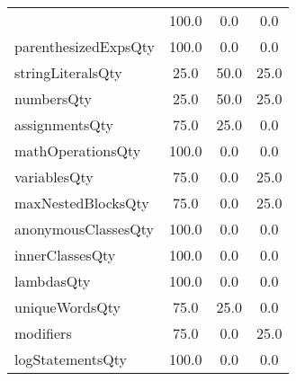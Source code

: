\begin{tabular}{lccc}
{tryCatchQty & 100.0 & 0.0 & 0.0 \\
parenthesizedExpsQty & 100.0 & 0.0 & 0.0 \\
stringLiteralsQty & 25.0 & 50.0 & 25.0 \\
numbersQty & 25.0 & 50.0 & 25.0 \\
assignmentsQty & 75.0 & 25.0 & 0.0 \\
mathOperationsQty & 100.0 & 0.0 & 0.0 \\
variablesQty & 75.0 & 0.0 & 25.0 \\
maxNestedBlocksQty & 75.0 & 0.0 & 25.0 \\
anonymousClassesQty & 100.0 & 0.0 & 0.0 \\
innerClassesQty & 100.0 & 0.0 & 0.0 \\
lambdasQty & 100.0 & 0.0 & 0.0 \\
uniqueWordsQty & 75.0 & 25.0 & 0.0 \\
modifiers & 75.0 & 0.0 & 25.0 \\
logStatementsQty & 100.0 & 0.0 & 0.0 \\
\bottomrule
              \end{tabular}
            